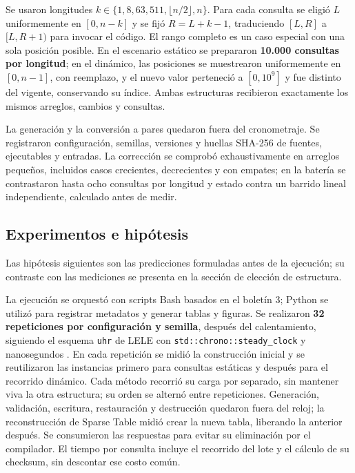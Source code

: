 Se usaron longitudes \(k\in\{1,8,63,511,\lfloor n/2\rfloor,n\}\).
Para cada consulta se eligió \(L\) uniformemente en \([0,n-k]\) y se
fijó \(R=L+k-1\), traduciendo \([L,R]\) a \([L,R+1)\) para invocar
el código. El rango completo es un caso especial con una sola posición
posible. En el escenario estático se prepararon \textbf{10.000 consultas por
longitud}; en el dinámico, las posiciones se muestrearon uniformemente
en \([0,n-1]\), con reemplazo, y el nuevo valor perteneció a \([0,10^9]\)
y fue distinto del vigente, conservando su índice. Ambas estructuras
recibieron exactamente los mismos arreglos, cambios y consultas.

La generación y la conversión a pares quedaron fuera del cronometraje.
Se registraron configuración, semillas, versiones y huellas SHA-256 de
fuentes, ejecutables y entradas. La corrección se comprobó exhaustivamente
en arreglos pequeños, incluidos casos crecientes, decrecientes y con empates;
en la batería se contrastaron hasta ocho consultas por longitud y estado
contra un barrido lineal independiente, calculado antes de medir.

\subsection{Experimentos e hipótesis}

Las hipótesis siguientes son las predicciones formuladas antes de la ejecución;
su contraste con las mediciones se presenta en la sección de elección de estructura.

La ejecución se orquestó con scripts Bash basados en el boletín 3;
Python se utilizó para registrar metadatos y generar tablas y figuras.
Se realizaron \textbf{32 repeticiones por configuración y semilla}, después
del calentamiento, siguiendo el esquema \texttt{uhr} de LELE con
\texttt{std::chrono::steady\_clock} y nanosegundos \cite{lovera-uhr}.
En cada repetición se midió la construcción inicial y se reutilizaron las
instancias primero para consultas estáticas y después para el recorrido
dinámico. Cada método recorrió su carga por separado, sin mantener viva la
otra estructura; su orden se alternó entre repeticiones.
Generación, validación, escritura, restauración y destrucción quedaron fuera
del reloj; la reconstrucción de Sparse Table midió crear la nueva tabla,
liberando la anterior después. Se consumieron las respuestas para evitar
su eliminación por el compilador. El tiempo por consulta incluye el recorrido
del lote y el cálculo de su checksum, sin descontar ese costo común.

